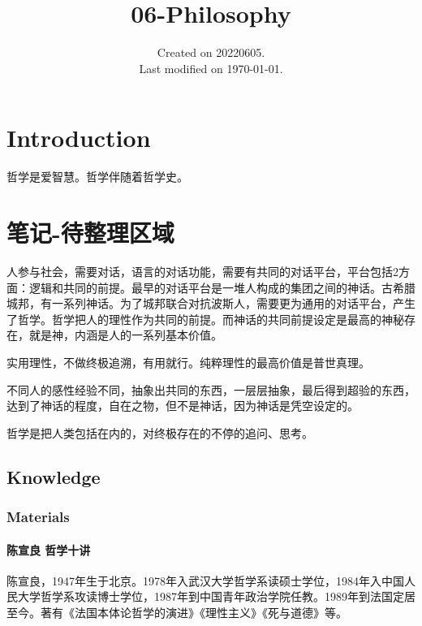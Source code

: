 \documentclass[UTF8]{../RepresentationUniverse}
\begin{document}
\title{06-Philosophy}
\date{Created on 20220605.\\   Last modified on \today.}
\maketitle
\tableofcontents


\chapter{Introduction}

哲学是爱智慧。哲学伴随着哲学史。



\chapter{笔记-待整理区域}



人参与社会，需要对话，语言的对话功能，需要有共同的对话平台，平台包括2方面：逻辑和共同的前提。最早的对话平台是一堆人构成的集团之间的神话。古希腊城邦，有一系列神话。为了城邦联合对抗波斯人，需要更为通用的对话平台，产生了哲学。哲学把人的理性作为共同的前提。而神话的共同前提设定是最高的神秘存在，就是神，内涵是人的一系列基本价值。

实用理性，不做终极追溯，有用就行。纯粹理性的最高价值是普世真理。

不同人的感性经验不同，抽象出共同的东西，一层层抽象，最后得到超验的东西，达到了神话的程度，自在之物，但不是神话，因为神话是凭空设定的。

哲学是把人类包括在内的，对终极存在的不停的追问、思考。

\section{Knowledge}

\subsection{Materials}

\subsubsection{ 陈宣良 哲学十讲}
陈宣良，1947年生于北京。1978年入武汉大学哲学系读硕士学位，1984年入中国人民大学哲学系攻读博士学位，1987年到中国青年政治学院任教。1989年到法国定居至今。著有《法国本体论哲学的演进》《理性主义》《死与道德》等。
\end{document}
